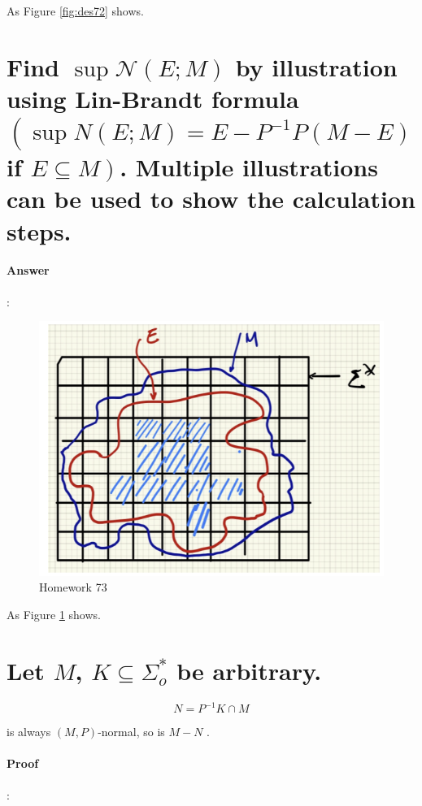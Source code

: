 \documentclass{article}
\begin{document}
As Figure \ref{fig:des72} shows.

\section{Find $\sup \mathcal{N}(E ; M)$ by illustration using Lin-Brandt formula $\left(\sup N(E ; M)=E-P^{-1} P(M-E)\right.$ if $\left.E \subseteq M\right)$. Multiple illustrations can be used to show the calculation steps.}

\paragraph{Answer}:

\begin{figure}[h]
  \centering
  \includegraphics{assets/DES73.png}
  \caption{Homework 73}
  \label{fig:des73}
\end{figure}

As Figure \ref{fig:des73} shows.


\section{Let $M$, $K \subseteq \Sigma_o^*$ be arbitrary. }

$$
N = P^{-1} K \cap M
$$

is always $(M, P )$-normal, so is $M - N$ .

\paragraph{Proof}:
\end{document}
